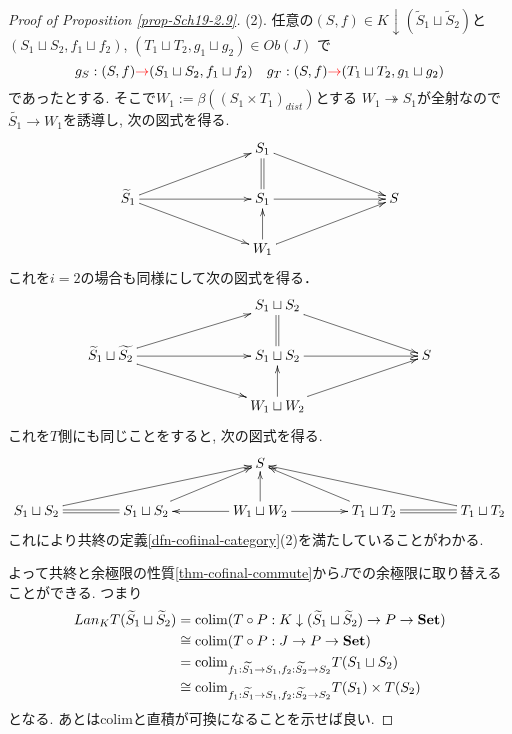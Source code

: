 \documentclass[dvipdfmx,a4paper,11pt]{article}
\newcommand{\colim}{{\rm colim}}
\theoremstyle{definition}
\newcommand{\xr}[1]{\textcolor{red}{#1}}
\begin{document}
\begin{proof}[Proof of Proposition \ref{prop-Sch19-2.9}]
(2). 任意の$(S, f) \in K \downarrow  (\widetilde{S}_1 \sqcup  \widetilde{S}_2)$と
$(S_1 \sqcup  S_2, f_1 \sqcup  f_2)$, $(T_1 \sqcup  T_2, g_1 \sqcup  g_2) \in Ob(J)$ で
$$
g_{S} : (S, f) \xr{\to}(S_1 \sqcup  S_2, f_1 \sqcup  f_2)
\quad
g_{T} : (S, f) \xr{\to}(T_1 \sqcup  T_2, g_1 \sqcup  g_2)
$$
であったとする.
そこで$W_1 := \beta((S_1\times T_1)_{dist})$とする
$W_1 \twoheadrightarrow S_1$が全射なので$\widetilde{S_1} \to W_1$を誘導し, 次の図式を得る. 
\begin{equation*}
\label{eq-conti}
\xymatrix@C=78pt@R=20pt{
&S_1 \ar@{->}[rd]\ar@{=}[d]
& 
\\
\widetilde{S}_1 
 \ar@{->}[r] \ar@{->}[rd]\ar@{->}[ru]
&S_1  \ar@{->}[r] 
& S
\\
&W_1 \ar@{->}[ru] \ar@{->}[u]
& 
\\
}
\end{equation*}
これを$i=2$の場合も同様にして次の図式を得る．
\begin{equation*}
\label{eq-conti}
\xymatrix@C=78pt@R=20pt{
&S_1\sqcup S_2 \ar@{->}[rd]\ar@{=}[d]
& 
\\
\widetilde{S}_1 \sqcup \widetilde{S_2}
 \ar@{->}[r] \ar@{->}[rd]\ar@{->}[ru]
&S_1 \sqcup S_2  \ar@{->}[r] 
& S
\\
&W_1\sqcup W_2 \ar@{->}[ru] \ar@{->}[u]
& 
\\
}
\end{equation*}
これを$T$側にも同じことをすると, 次の図式を得る. 
\begin{equation*}
\label{eq-conti}
\xymatrix@C=40pt@R=20pt{
&
&
S&
&
\\
S_1 \sqcup S_2\ar@{->}[rru] \ar@{=}[r]&
S_1 \sqcup S_2\ar@{->}[ru]&
W_1 \sqcup W_2\ar@{->}[u] \ar@{->}[r] \ar@{->}[l]&
T_1 \sqcup T_2\ar@{->}[lu]\ar@{=}[r]&
T_1 \sqcup T_2 \ar@{->}[llu]
}
\end{equation*}
これにより共終の定義\ref{dfn-cofiinal-category}(2)を満たしていることがわかる.

よって共終と余極限の性質\ref{thm-cofinal-commute}から$J$での余極限に取り替えることができる. つまり
\begin{align*}
\begin{split}
Lan_{K}T (\widetilde{S}_1 \sqcup  \widetilde{S}_2) 
&=
\colim(T \circ P : K \downarrow  (\widetilde{S}_1 \sqcup  \widetilde{S}_2) \to P \to {\bf Set}) \\
&\cong
\colim(T \circ P : J   \to P \to {\bf Set}) \\
&=
\colim_{f_1: \widetilde{S_1} \to S_1,  f_2: \widetilde{S_2} \to S_2} T(S_1 \sqcup  S_2) \\
& \cong 
\colim_{f_1 : \widetilde{S_1} \to S_1,  f_2: \widetilde{S_2} \to S_2} T(S_1) \times  T( S_2)
\end{split}
\end{align*}
となる.
あとはcolimと直積が可換になることを示せば良い.


\end{proof}
\end{document}

